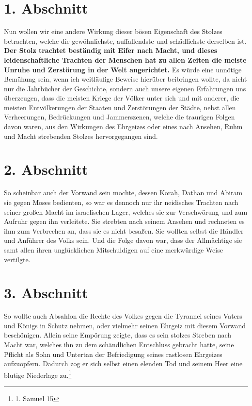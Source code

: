 \newpage

\section{1. Abschnitt} \label{kap8_ab1}

Nun wollen wir eine andere Wirkung dieser bösen Eigenschaft des Stolzes
betrachten, welche die gewöhnlichste, auffallendste und schädlichste derselben
ist.
\label{ref:08_01_stolz} \textbf{
    Der Stolz trachtet beständig mit Eifer nach Macht, und
dieses leidenschaftliche Trachten der Menschen hat zu allen Zeiten die meiste
Unruhe und Zerstörung in der Welt angerichtet.
}Es würde eine unnötige Bemühung sein,
wenn ich weitläufige Beweise hierüber beibringen wollte, da nicht nur die
Jahrbücher der Geschichte, sondern auch unsere eigenen Erfahrungen uns
überzeugen, dass die meisten Kriege der Völker unter sich und mit
anderer, die
meisten Entvölkerungen der Staaten und Zerstörungen der Städte, nebst allen
Verheerungen, Bedrückungen und Jammerszenen,
welche die traurigen Folgen davon waren, aus den Wirkungen des
Ehrgeizes oder eines nach Ansehen, Ruhm und Macht strebenden Stolzes
hervorgegangen sind.

\section{2. Abschnitt} \label{kap8_ab2}

So scheinbar auch der Vorwand sein mochte, dessen Korah,
Dathan und Abiram sie
gegen Moses bedienten, so war es dennoch nur ihr
neidisches Trachten nach seiner
großen Macht im israelischen Lager, welches sie zur Verschwörung und zum
Aufruhr gegen ihn verleitete. Sie strebten nach seinem Ansehen und rechneten es
ihm zum Verbrechen an, dass sie es nicht besaßen. Sie wollten selbst die Händler
und Anführer des Volks sein. Und die Folge davon war, dass der Allmächtige sie
samt allen ihren unglücklichen Mitschuldigen auf eine merkwürdige Weise
vertilgte.

\section{3. Abschnitt} \label{kap8_ab3}

So wollte auch Absahlon die Rechte des Volkes gegen
die Tyrannei seines Vaters
und Königs in Schutz nehmen, oder vielmehr seinen Ehrgeiz mit diesem Vorwand
beschönigen. Allein seine Empörung zeigte, dass es sein stolzes Streben nach
Macht war, welches ihn zu dem schändlichen Entschluss gebracht hatte, seine
Pflicht als Sohn und Untertan der Befriedigung seines rastlosen Ehrgeizes
aufzuopfern. Dadurch zog er sich selbst einen elenden Tod und seinem Heer eine
blutige Niederlage zu.\footnote{1. Samuel 15}

